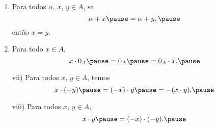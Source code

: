 \documentclass{beamer}
\begin{document}
    \begin{frame}
        \begin{proposicao}
            \begin{enumerate}[label={\roman*})]
                \conti

                \item Para todos $\alpha$, \pause $x$, \pause $y \in A$, \pause se
                \[
                    \alpha + x \pause = \alpha + y,\pause
                \]
                ent{\~a}o $x = y$.\pause

                \vspace{.5cm}

                \item Para todo $x \in A$, \pause
                \[
                    x\cdot 0_A \pause = 0_A \pause = 0_A\cdot x.\pause
                \]

                \vspace{.5cm}
            \end{enumerate}
        \end{proposicao}
    \end{frame}

    \begin{frame}
        \begin{proposicao}
            \begin{enumerate}
                \item[vii)] Para todos $x$, \pause $y \in A$, \pause temos\pause
                \[
                    x \cdot (-y) \pause = (-x) \cdot y \pause = -(x \cdot y).\pause
                \]

                \vspace{.5cm}

                \item[viii)] Para todos $x$, \pause $y \in A$, \pause
                \[
                    x \cdot y \pause = (-x) \cdot (-y).\pause
                \]

                \vspace{.5cm}
            \end{enumerate}
        \end{proposicao}
    \end{frame}
\end{document}
